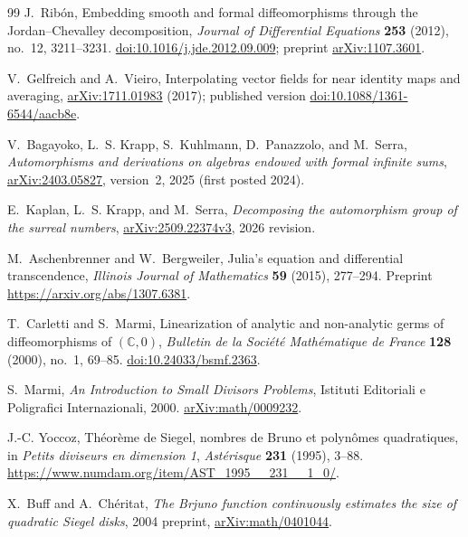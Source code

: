 \documentclass[11pt,letterpaper]{article}
\theoremstyle{definition}
\theoremstyle{remark}
\newcommand{\C}{\mathbb C}
\numberwithin{equation}{section}
\begin{document}
\begin{thebibliography}{99}
J.~Rib\'on,
Embedding smooth and formal diffeomorphisms through the Jordan--Chevalley
decomposition,
\emph{Journal of Differential Equations} \textbf{253} (2012), no.~12,
3211--3231.
\href{https://doi.org/10.1016/j.jde.2012.09.009}{doi:10.1016/j.jde.2012.09.009};
preprint \href{https://arxiv.org/abs/1107.3601}{arXiv:1107.3601}.

V.~Gelfreich and A.~Vieiro,
Interpolating vector fields for near identity maps and averaging,
\href{https://arxiv.org/abs/1711.01983}{arXiv:1711.01983} (2017);
published version
\href{https://doi.org/10.1088/1361-6544/aacb8e}{doi:10.1088/1361-6544/aacb8e}.

V.~Bagayoko, L.~S. Krapp, S.~Kuhlmann, D.~Panazzolo, and M.~Serra,
\emph{Automorphisms and derivations on algebras endowed with formal
infinite sums}, \href{https://arxiv.org/abs/2403.05827}{arXiv:2403.05827},
version~2, 2025 (first posted 2024).

E.~Kaplan, L.~S. Krapp, and M.~Serra,
\emph{Decomposing the automorphism group of the surreal numbers},
\href{https://arxiv.org/abs/2509.22374v3}{arXiv:2509.22374v3}, 2026
revision.

M.~Aschenbrenner and W.~Bergweiler,
Julia's equation and differential transcendence,
\emph{Illinois Journal of Mathematics} \textbf{59} (2015), 277--294.
Preprint \url{https://arxiv.org/abs/1307.6381}.

T.~Carletti and S.~Marmi,
Linearization of analytic and non-analytic germs of diffeomorphisms of
$(\C,0)$,
\emph{Bulletin de la Soci\'et\'e Math\'ematique de France} \textbf{128}
(2000), no.~1, 69--85.
\href{https://doi.org/10.24033/bsmf.2363}{doi:10.24033/bsmf.2363}.

S.~Marmi,
\emph{An Introduction to Small Divisors Problems},
Istituti Editoriali e Poligrafici Internazionali, 2000.
\href{https://arxiv.org/abs/math/0009232}{arXiv:math/0009232}.

J.-C. Yoccoz,
Th\'eor\`eme de Siegel, nombres de Bruno et polyn\^omes quadratiques,
in \emph{Petits diviseurs en dimension 1},
\emph{Ast\'erisque} \textbf{231} (1995), 3--88.
\url{https://www.numdam.org/item/AST_1995__231__1_0/}.

X.~Buff and A.~Ch\'eritat,
\emph{The Brjuno function continuously estimates the size of quadratic
Siegel disks}, 2004 preprint,
\href{https://arxiv.org/abs/math/0401044}{arXiv:math/0401044}.


\end{thebibliography}
\end{document}

